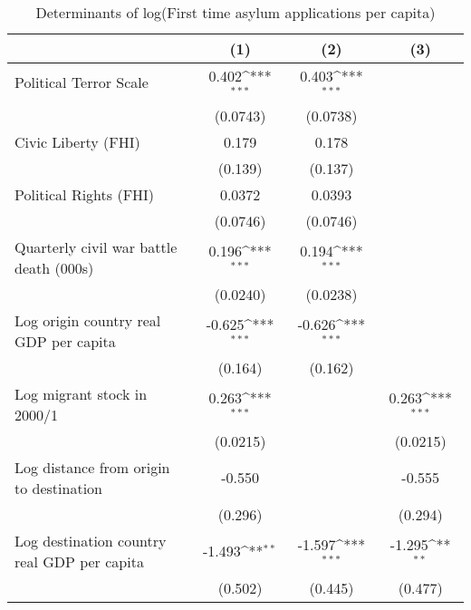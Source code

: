 \begin{table}[htbp]\centering
\def\sym#1{\ifmmode^{#1}\else\(^{#1}\)\fi}
\caption{Determinants of log(First time asylum applications per capita)}
\begin{tabular}{l*{3}{c}}
\hline\hline
                    &\multicolumn{1}{c}{(1)}         &\multicolumn{1}{c}{(2)}         &\multicolumn{1}{c}{(3)}         \\
\hline
Political Terror Scale&       0.402\sym{***}&       0.403\sym{***}&                     \\
                    &    (0.0743)         &    (0.0738)         &                     \\
[1em]
Civic Liberty (FHI) &       0.179         &       0.178         &                     \\
                    &     (0.139)         &     (0.137)         &                     \\
[1em]
Political Rights (FHI)&      0.0372         &      0.0393         &                     \\
                    &    (0.0746)         &    (0.0746)         &                     \\
[1em]
Quarterly civil war battle death (000s)&       0.196\sym{***}&       0.194\sym{***}&                     \\
                    &    (0.0240)         &    (0.0238)         &                     \\
[1em]
Log origin country real GDP per capita&      -0.625\sym{***}&      -0.626\sym{***}&                     \\
                    &     (0.164)         &     (0.162)         &                     \\
[1em]
Log migrant stock in 2000/1&       0.263\sym{***}&                     &       0.263\sym{***}\\
                    &    (0.0215)         &                     &    (0.0215)         \\
[1em]
Log distance from origin to destination&      -0.550         &                     &      -0.555         \\
                    &     (0.296)         &                     &     (0.294)         \\
[1em]
Log destination country real GDP per capita&      -1.493\sym{**} &      -1.597\sym{***}&      -1.295\sym{**} \\
                    &     (0.502)         &     (0.445)         &     (0.477)         \\

\end{tabular}
\end{table}
